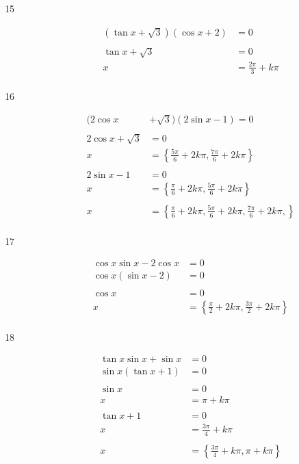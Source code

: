 \documentclass{exam}
\begin{document}
\begin{description}
      \item[15] 
        \begin{align*}
          (\tan x + \sqrt{3}) (\cos x + 2) & = 0 \\
          \\
          \tan x + \sqrt{3} & = 0 \\
          x                 & = \boxed{ \frac{2 \pi}{3} + k \pi } \\
        \end{align*}

      \item[16] 
        \begin{align*}
          (2 \cos x & + \sqrt{3}) (2 \sin x - 1) = 0 \\
          \\
          2 \cos x + \sqrt{3} & = 0 \\
          x                   & = \left\{ \frac{5 \pi}{6} + 2 k \pi, \frac{7 \pi}{6} + 2 k \pi \right\} \\
          \\
          2 \sin x - 1 & = 0 \\
          x                   & = \left\{ \frac{\pi}{6} + 2 k \pi, \frac{5 \pi}{6} + 2 k \pi \right\} \\
          \\
          x & = \boxed{ \left\{ \frac{\pi}{6} + 2 k \pi, \frac{5 \pi}{6} + 2 k \pi, \frac{7 \pi}{6} + 2 k \pi, \right\} } \\
        \end{align*}

      \item[17] 
        \begin{align*}
          \cos x \sin x - 2 \cos x & = 0 \\
          \cos x (\sin x - 2)      & = 0 \\
          \\
          \cos x & = 0 \\
          x      & = \boxed{ \left\{ \frac{\pi}{2} + 2k \pi, \frac{3 \pi}{2} + 2k \pi \right\} } \\
        \end{align*}

      \item[18] 
        \begin{align*}
          \tan x \sin x + \sin x & = 0 \\
          \sin x (\tan x + 1)    & = 0 \\
          \\
          \sin x & = 0 \\
          x      & = \pi + k \pi  \\
          \\
          \tan x + 1 & = 0 \\
          x      & = \frac{3 \pi}{4} + k \pi \\
          \\
          x      & = \boxed{ \left\{ \frac{3 \pi}{4} + k \pi ,\pi + k \pi \right\} } \\
        \end{align*}


\end{description}
\end{document}

